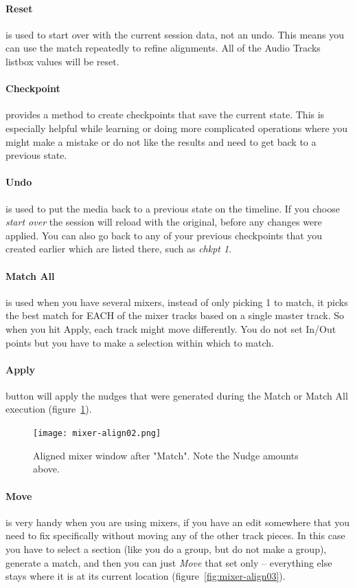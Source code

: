 \paragraph{Reset} is used to start over with the current session data, not an undo.  This means you can use the match repeatedly to refine alignments.  All of the Audio Tracks listbox values will be reset.

\paragraph{Checkpoint} provides a method to create checkpoints that save the current state.  This is especially helpful while learning or doing more complicated operations where you might make a mistake or do not like the results and need to get back to a previous state.

\paragraph{Undo} is used to put the media back to a previous state on the timeline.  If you choose \textit{start over} the session will reload with the original, before any changes were applied.  You can also go back to any of your previous checkpoints that you created earlier which are listed there, such as \textit{chkpt 1}.

\paragraph{Match All}is used when you have several mixers, instead of only picking 1 to match, it picks the best match for EACH of the mixer tracks based on a single master track. So when you hit Apply, each track might move differently. You do not set In/Out points but you have to make a selection within which to match.

\paragraph{Apply} button will apply the nudges that were generated during the Match or Match All execution (figure~\ref{fig:mixer-align02}).

\begin{figure}[htpb]
	\centering
	\texttt{[image: mixer-align02.png]}
	\caption{Aligned mixer window after "Match". Note the Nudge amounts above.}
	\label{fig:mixer-align02}
\end{figure}

\paragraph{Move} is very handy when you are using mixers, if you have an edit somewhere that you need to fix specifically without moving any of the other track pieces. In this case you have to select a section (like you do a group, but do not make a group), generate a match, and then you can just \textit{Move} that set only -- everything else stays where it is at its current location (figure~\ref{fig:mixer-align03}).

